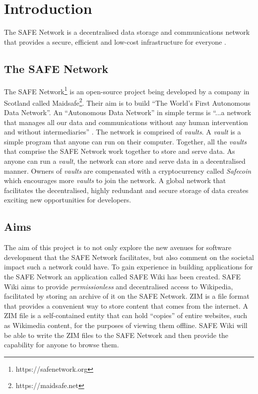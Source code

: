 \chapter{Introduction}

\begin{displayquote}
The SAFE Network is a decentralised data storage and communications network that provides a secure, efficient and low-cost infrastructure for everyone \cite{safenetwork}.
\end{displayquote}

\section{The SAFE Network}

The SAFE Network\footnote{https://safenetwork.org} is an open-source project being developed by a company in Scotland called Maidsafe\footnote{https://maidsafe.net}. Their aim is to build ``The World's First Autonomous Data Network''. An ``Autonomous Data Network'' in simple terms is ``...a network that manages all our data and communications without any human intervention and without intermediaries'' \cite{autonomous-data-networks}. The network is comprised of \textit{vaults}. A \textit{vault} is a simple program that anyone can run on their computer. Together, all the \textit{vaults} that comprise the SAFE Network work together to store and serve data. As anyone can run a \textit{vault}, the network can store and serve data in a decentralised manner. Owners of \textit{vaults} are compensated with a cryptocurrency called \textit{Safecoin} which encourages more \textit{vaults} to join the network. A global network that facilitates the decentralised, highly redundant and secure storage of data creates exciting new opportunities for developers.

\section{Aims}

The aim of this project is to not only explore the new avenues for software development that the SAFE Network facilitates, but also comment on the societal impact such a network could have. To gain experience in building applications for the SAFE Network an application called SAFE Wiki has been created. SAFE Wiki aims to provide \textit{permissionless} and decentralised access to Wikipedia, facilitated by storing an archive of it on the SAFE Network. ZIM\cite{zim} is a file format that provides a convenient way to store content that comes from the internet. A ZIM file is a self-contained entity that can hold ``copies'' of entire websites, such as Wikimedia content, for the purposes of viewing them offline. SAFE Wiki will be able to write the ZIM files to the SAFE Network and then provide the capability for anyone to browse them. 

